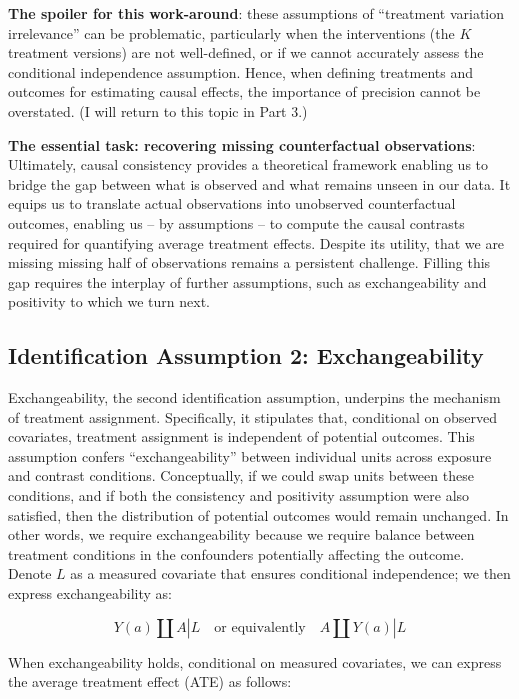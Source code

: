 \documentclass[
  singlecolumn]{report}
\begin{document}
\textbf{The spoiler for this work-around}: these assumptions of
``treatment variation irrelevance'' can be problematic, particularly
when the interventions (the \(K\) treatment versions) are not
well-defined, or if we cannot accurately assess the conditional
independence assumption. Hence, when defining treatments and outcomes
for estimating causal effects, the importance of precision cannot be
overstated. (I will return to this topic in Part 3.)

\textbf{The essential task: recovering missing counterfactual
observations}: Ultimately, causal consistency provides a theoretical
framework enabling us to bridge the gap between what is observed and
what remains unseen in our data. It equips us to translate actual
observations into unobserved counterfactual outcomes, enabling us -- by
assumptions -- to compute the causal contrasts required for quantifying
average treatment effects. Despite its utility, that we are missing
missing half of observations remains a persistent challenge. Filling
this gap requires the interplay of further assumptions, such as
exchangeability and positivity to which we turn next.

\hypertarget{identification-assumption-2-exchangeability}{%
\subsection{Identification Assumption 2:
Exchangeability}\label{identification-assumption-2-exchangeability}}

Exchangeability, the second identification assumption, underpins the
mechanism of treatment assignment. Specifically, it stipulates that,
conditional on observed covariates, treatment assignment is independent
of potential outcomes. This assumption confers ``exchangeability''
between individual units across exposure and contrast conditions.
Conceptually, if we could swap units between these conditions, and if
both the consistency and positivity assumption were also satisfied, then
the distribution of potential outcomes would remain unchanged. In other
words, we require exchangeability because we require balance between
treatment conditions in the confounders potentially affecting the
outcome. Denote \(L\) as a measured covariate that ensures conditional
independence; we then express exchangeability as:

\[
Y(a) \coprod  A|L \quad \text{or equivalently} \quad A \coprod  Y(a)|L
\]

When exchangeability holds, conditional on measured covariates, we can
express the average treatment effect (ATE) as follows:
\end{document}
